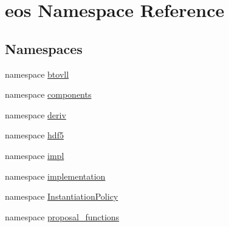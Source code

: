 \hypertarget{namespaceeos}{
\section{eos Namespace Reference}
\label{namespaceeos}
}
\subsection*{Namespaces}
\begin{DoxyCompactItemize}
\item 
namespace \hyperlink{namespaceeos_1_1btovll}{btovll}
\item 
namespace \hyperlink{namespaceeos_1_1components}{components}
\item 
namespace \hyperlink{namespaceeos_1_1deriv}{deriv}
\item 
namespace \hyperlink{namespaceeos_1_1hdf5}{hdf5}
\item 
namespace \hyperlink{namespaceeos_1_1impl}{impl}
\item 
namespace \hyperlink{namespaceeos_1_1implementation}{implementation}
\item 
namespace \hyperlink{namespaceeos_1_1InstantiationPolicy}{InstantiationPolicy}
\item 
namespace \hyperlink{namespaceeos_1_1proposal__functions}{proposal\_\-functions}
\end{DoxyCompactItemize}
